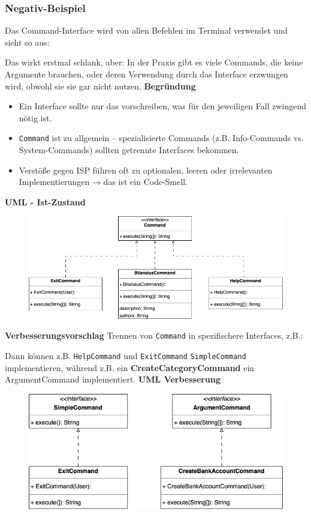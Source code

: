 \subsubsection*{Negativ-Beispiel}
Das Command-Interface wird von allen Befehlen im Terminal verwendet und sieht so aus:

Das wirkt erstmal schlank, aber: In der Praxis gibt es viele Commands, die keine Argumente brauchen, oder deren Verwendung durch das Interface erzwungen wird, obwohl sie sie gar nicht nutzen.
\textbf{Begründung}
\begin{itemize}
    \item Ein Interface sollte nur das vorschreiben, was für den jeweiligen Fall zwingend nötig ist.
    \item \texttt{Command} ist zu allgemein – spezialisierte Commands (z.B. Info-Commands vs. System-Commands) sollten getrennte Interfaces bekommen.
    \item Verstöße gegen ISP führen oft zu optionalen, leeren oder irrelevanten Implementierungen → das ist ein Code-Smell.
\end{itemize}
\textbf{UML - Ist-Zustand}\newline
\begin{figure}[htbp]
    \centering
    \includegraphics[width=\linewidth]{kapitel3_solid/ISP_neg_Command2.drawio.png}
\end{figure}
\newline
\textbf{Verbesserungsvorschlag}\newline
Trennen von \texttt{Command} in spezifischere Interfaces, z.B.:

Dann können z.B. \texttt{HelpCommand} und \texttt{ExitCommand} \texttt{SimpleCommand} implementieren, während z.B. ein \textbf{CreateCategoryCommand} ein ArgumentCommand implementiert.\newline\newline
\textbf{UML Verbesserung}
\begin{figure}[htbp]
    \centering
    \includegraphics[width=\linewidth]{kapitel3_solid/ISP_neg_betterCommand2.drawio.png}
\end{figure}